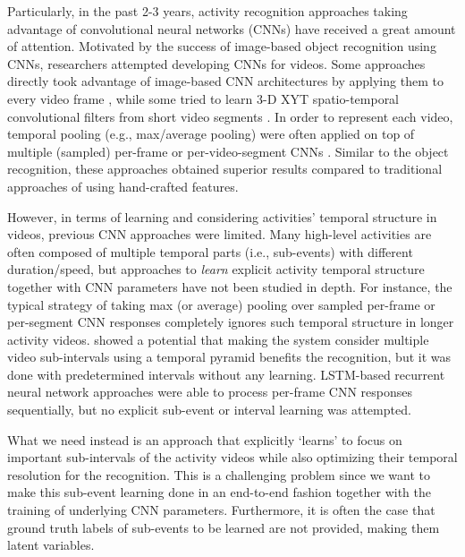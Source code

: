 \documentclass[letterpaper]{article}
\begin{document}
Particularly, in the past 2-3 years, activity recognition approaches taking advantage of convolutional neural networks (CNNs) have received a great amount of attention. Motivated by the success of image-based object recognition using CNNs, researchers attempted developing CNNs for videos. Some approaches directly took advantage of image-based CNN architectures by applying them to every video frame \cite{jain14,google15}, while some tried to learn 3-D XYT spatio-temporal convolutional filters from short video segments \cite{c3d}. In order to represent each video, temporal pooling (e.g., max/average pooling) were often applied on top of multiple (sampled) per-frame or per-video-segment CNNs \cite{jain14,karpathy14,simonyan14,google15,c3d}. Similar to the object recognition, these approaches obtained superior results compared to traditional approaches of using hand-crafted features.

However, in terms of learning and considering activities' temporal structure in videos, previous CNN approaches were limited. Many high-level activities are often composed of multiple temporal parts (i.e., sub-events) with different duration/speed, but approaches to \emph{learn} explicit activity temporal structure together with CNN parameters have not been studied in depth. For instance, the typical strategy of taking max (or average) pooling over sampled per-frame or per-segment CNN responses \cite{jain14,simonyan14,google15,c3d} completely ignores such temporal structure in longer activity videos. \cite{ryoo15} showed a potential that making the system consider multiple video sub-intervals using a temporal pyramid benefits the recognition, but it was done with predetermined intervals without any learning. LSTM-based recurrent neural network approaches \cite{google15,yeong16} were able to process per-frame CNN responses sequentially, but no explicit sub-event or interval learning was attempted.

What we need instead is an approach that explicitly `learns' to focus on important sub-intervals of the activity videos while also optimizing their temporal resolution for the recognition. This is a challenging problem since we want to make this sub-event learning done in an end-to-end fashion together with the training of underlying CNN parameters. Furthermore, it is often the case that ground truth labels of sub-events to be learned are not provided, making them latent variables.
\end{document}
